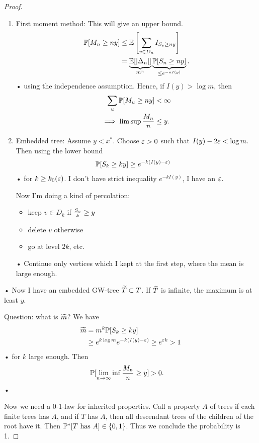 \begin{proof}
\begin{enumerate}
\item
First moment method: This will give an upper bound. %
\begin{align*}
\mathbb{P}[M_n \ge ny] &\le \mathbb{E}\left[ {\sum_{v\in D_n} I_{S_v\ge ny}} \right]\\
&= \underbrace{\mathbb{E} [|\Delta_n|]}_{m^n}\underbrace{\mathbb{P}[S_n\ge ny]}_{\le e^{-nI(y)}}.
\end{align*}•
using the independence assumption.
Hence, if $I(y) > \log m$, then 
\begin{align*}
\sum_u \mathbb{P}[M_u \ge ny] &<\infty\\
\implies \limsup \frac{M_n}{n}&\le y.
\end{align*}
\item 
Embedded tree: Assume $y<x^*$. Choose $\varepsilon>0$ such that $I(y)-2\varepsilon<\log m$. Then using the lower bound
\begin{align*}
\mathbb{P}[S_k\ge ky] &\ge e^{-k(I(y)-\varepsilon)}
\end{align*}•
for $k\ge k_0(\varepsilon)$. I don't have strict inequality $e^{-kI(y)}$, I have an $\varepsilon$.

Now I'm doing a kind of percolation: 
\begin{itemize}
\item
keep $v\in D_k$ if $\frac{S_v}{k} \ge y$
\item
delete $v$ otherwise
\item
go at level $2k$, etc.
\end{itemize}•
Continue only vertices which I kept at the first step, where the mean is large enough.
\end{enumerate}•
Now I have an embedded GW-tree $\widetilde{T}\subset T$. If $\widetilde{T}$ is infinite, the maximum is at least $y$.

Question: what is $\widetilde{m}$? We have
\begin{align*}
\widetilde{m} &= m^k \mathbb{P}[S_k \ge ky]\\
&\ge e^{k\log m} e^{-k(I(y)-\varepsilon)} \ge e^{\varepsilon k}>1
\end{align*}•
for $k$ large enough.
Then 
\begin{align*}
\mathbb{P}[\lim_{n\to \infty} \inf \frac{M_n}{n} \ge y] &>0.
\end{align*}•

Now we need a 0-1-law for inherited properties. Call a property $A$ of trees  if each finite trees has $A$, and if $T$ has $A$, then all descendant trees of the children of the root have it. 
Then $\mathbb{P}^*[T\text{ has }A]\in \{0,1\}$.
Thus we conclude the probability is 1.
\end{proof}
